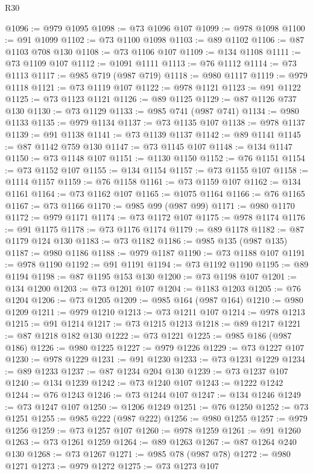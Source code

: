 \begin{lexlean}{R30}
\begin{coremodule}
@1096 := @979 @1095
@1098 := @73 @1096 @107
@1099 := @978 @1098
@1100 := @91 @1099
@1102 := @73 @1100 @1098
@1103 := @89 @1102
@1106 := @87 @1103 @708 @130
@1108 := @73 @1106 @107
@1109 := @134 @1108
@1111 := @73 @1109 @107
@1112 := @1091 @1111
@1113 := @76 @1112
@1114 := @73 @1113
@1117 := @985 @719 (@987 @719)
@1118 := @980 @1117
@1119 := @979 @1118
@1121 := @73 @1119 @107
@1122 := @978 @1121
@1123 := @91 @1122
@1125 := @73 @1123 @1121
@1126 := @89 @1125
@1129 := @87 @1126 @737 @130
@1130 := @73 @1129
@1133 := @985 @741 (@987 @741)
@1134 := @980 @1133
@1135 := @979 @1134
@1137 := @73 @1135 @107
@1138 := @978 @1137
@1139 := @91 @1138
@1141 := @73 @1139 @1137
@1142 := @89 @1141
@1145 := @87 @1142 @759 @130
@1147 := @73 @1145 @107
@1148 := @134 @1147
@1150 := @73 @1148 @107
@1151 := @1130 @1150
@1152 := @76 @1151
@1154 := @73 @1152 @107
@1155 := @134 @1154
@1157 := @73 @1155 @107
@1158 := @1114 @1157
@1159 := @76 @1158
@1161 := @73 @1159 @107
@1162 := @134 @1161
@1164 := @73 @1162 @107
@1165 := @1075 @1164
@1166 := @76 @1165
@1167 := @73 @1166
@1170 := @985 @99 (@987 @99)
@1171 := @980 @1170
@1172 := @979 @1171
@1174 := @73 @1172 @107
@1175 := @978 @1174
@1176 := @91 @1175
@1178 := @73 @1176 @1174
@1179 := @89 @1178
@1182 := @87 @1179 @124 @130
@1183 := @73 @1182
@1186 := @985 @135 (@987 @135)
@1187 := @980 @1186
@1188 := @979 @1187
@1190 := @73 @1188 @107
@1191 := @978 @1190
@1192 := @91 @1191
@1194 := @73 @1192 @1190
@1195 := @89 @1194
@1198 := @87 @1195 @153 @130
@1200 := @73 @1198 @107
@1201 := @134 @1200
@1203 := @73 @1201 @107
@1204 := @1183 @1203
@1205 := @76 @1204
@1206 := @73 @1205
@1209 := @985 @164 (@987 @164)
@1210 := @980 @1209
@1211 := @979 @1210
@1213 := @73 @1211 @107
@1214 := @978 @1213
@1215 := @91 @1214
@1217 := @73 @1215 @1213
@1218 := @89 @1217
@1221 := @87 @1218 @182 @130
@1222 := @73 @1221
@1225 := @985 @186 (@987 @186)
@1226 := @980 @1225
@1227 := @979 @1226
@1229 := @73 @1227 @107
@1230 := @978 @1229
@1231 := @91 @1230
@1233 := @73 @1231 @1229
@1234 := @89 @1233
@1237 := @87 @1234 @204 @130
@1239 := @73 @1237 @107
@1240 := @134 @1239
@1242 := @73 @1240 @107
@1243 := @1222 @1242
@1244 := @76 @1243
@1246 := @73 @1244 @107
@1247 := @134 @1246
@1249 := @73 @1247 @107
@1250 := @1206 @1249
@1251 := @76 @1250
@1252 := @73 @1251
@1255 := @985 @222 (@987 @222)
@1256 := @980 @1255
@1257 := @979 @1256
@1259 := @73 @1257 @107
@1260 := @978 @1259
@1261 := @91 @1260
@1263 := @73 @1261 @1259
@1264 := @89 @1263
@1267 := @87 @1264 @240 @130
@1268 := @73 @1267
@1271 := @985 @78 (@987 @78)
@1272 := @980 @1271
@1273 := @979 @1272
@1275 := @73 @1273 @107

\end{coremodule}
\end{lexlean}
